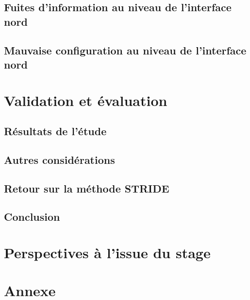 \documentclass[11pt]{article}
\begin{document}
	\subsection{Fuites d'information au niveau de l'interface nord}
		
		\newpage
	\subsection{Mauvaise configuration au niveau de l'interface nord}
		
\newpage
{}
\section{Validation et évaluation}
	\subsection{Résultats de l'étude}
		
	\subsection{Autres considérations}
		
	\subsection{Retour sur la méthode STRIDE}
		
	\newpage
	\subsection{Conclusion}
		
\newpage
{}
\section{Perspectives à l'issue du stage}
	

\newpage
{}
\begin{small}


\end{small}
\nocite{*}

\newpage
\fancyhead[L]{~\\}
\appendix
\section{Annexe}
	
	\newpage
	
	\newpage
	
	\newpage
	
	\newpage
	
\end{document}
